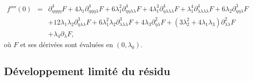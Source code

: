 \documentclass{article}
\newcommand{\nocomma}{}
\begin{document}
\begin{eqnarray}
  f'''' (0) & = & \partial_{\eta \nocomma \eta \nocomma \eta \nocomma \eta}^4
  F + 4 \lambda_1 \partial_{\eta \nocomma \eta \nocomma \eta \nocomma
  \lambda}^4 F + 6 \lambda_1^2 \partial_{\eta \nocomma \eta \nocomma \lambda
  \nocomma \lambda}^4 F + 4 \lambda_1^3 \partial_{\eta \nocomma \lambda
  \nocomma \lambda \nocomma \lambda}^4 F + \lambda_1^4 \partial_{\lambda
  \nocomma \lambda \nocomma \lambda \nocomma \lambda}^4 F + 6 \lambda_2
  \partial_{\eta \nocomma \eta \nocomma \lambda}^3 F \nonumber\\
  &  & + 12 \lambda_1 \lambda_2 \partial_{\eta \nocomma \lambda \nocomma
  \lambda}^3 F + 6 \lambda_1^2 \lambda_2 \partial_{\lambda \nocomma \lambda
  \nocomma \lambda}^3 F + 4 \lambda_3 \partial_{\eta \nocomma \lambda}^2 F +
  (3 \lambda_2^2 + 4 \lambda_1 \lambda_3) \partial_{\lambda \nocomma
  \lambda}^2 F \nonumber\\
  &  & + \lambda_4 \partial_{\lambda} F,
\end{eqnarray}
o{\`u} $F$ et ses d{\'e}riv{\'e}es sont {\'e}valu{\'e}es en $(0, \lambda_0)$.

\subsection{D{\'e}veloppement limit{\'e} du
r{\'e}sidu}\label{sec20211112182000}
\end{document}
